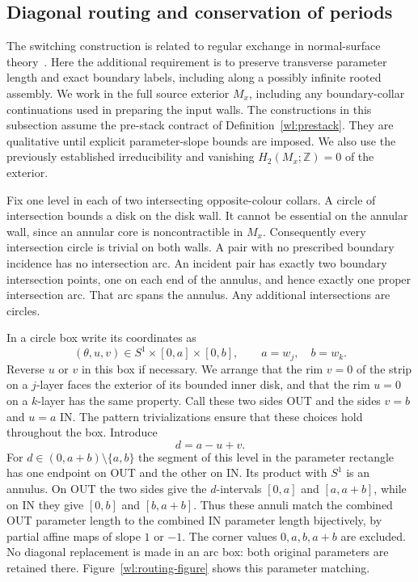\subsection{Diagonal routing and conservation of periods}
\label{wl:routing-subsection}

The switching construction is related to regular exchange in
normal-surface theory~\cite{Haken1961}.  Here the additional requirement
is to preserve transverse parameter length and exact boundary labels,
including along a possibly infinite rooted assembly.
We work in the full source exterior $M_x$, including any boundary-collar
continuations used in preparing the input walls.  The constructions in
this subsection
assume the pre-stack contract of Definition~\ref{wl:prestack}.  They are
qualitative until explicit parameter-slope bounds are imposed.  We also use
the previously established irreducibility and vanishing
$H_2(M_x;\mathbb Z)=0$ of the exterior.

Fix one level in each of two intersecting opposite-colour collars.  A circle
of intersection bounds a disk on the disk wall.  It cannot be essential on
the annular wall, since an annular core is noncontractible in $M_x$.
Consequently every intersection circle is trivial on both walls.  A pair
with no prescribed boundary incidence has no intersection arc.  An incident
pair has exactly two boundary intersection points, one on each end of the
annulus, and hence exactly one proper intersection arc.  That arc spans the
annulus.  Any additional intersections are circles.

In a circle box write its coordinates as
\[
                (\theta,u,v)\in S^1\times[0,a]\times[0,b],
                \qquad a=w_j,\quad b=w_k.
\]
Reverse $u$ or $v$ in this box if necessary.  We arrange that the rim $v=0$
of the strip on a $j$-layer faces the exterior of its bounded inner disk,
and that the rim $u=0$ on a $k$-layer has the same property.  Call these two
sides OUT and the sides $v=b$ and $u=a$ IN.  The pattern trivializations
ensure that these choices hold throughout the box.  Introduce
\begin{equation}
\label{wl:diagonal-coordinate}
                              d=a-u+v.
\end{equation}
For $d\in(0,a+b)\setminus\{a,b\}$ the segment of this level in the parameter
rectangle has one endpoint on OUT and the other on IN.  Its product with
$S^1$ is an annulus.  On OUT the two sides give the $d$-intervals $[0,a]$
and $[a,a+b]$, while on IN they give $[0,b]$ and $[b,a+b]$.
Thus these annuli match the combined OUT parameter length to the combined
IN parameter length bijectively, by partial affine maps of slope $1$ or
$-1$.  The corner values $0,a,b,a+b$ are excluded.  No diagonal replacement
is made in an arc box: both original parameters are retained there.
Figure~\ref{wl:routing-figure} shows this parameter matching.

